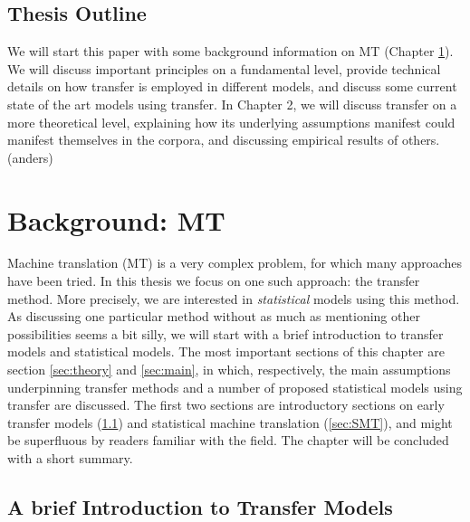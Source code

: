 \documentclass[a4paper, 11pt]{report}
\theoremstyle{definition}
\theoremstyle{plain}
\begin{document}
\section*{Thesis Outline}

We will start this paper with some background information on MT (Chapter \ref{ch:background}). We will discuss important principles on a fundamental level, provide technical details on how transfer is employed in different models, and discuss some current state of the art models using transfer. In Chapter 2, we will discuss transfer on a more theoretical level, explaining how its underlying assumptions manifest could manifest themselves in the corpora, and discussing empirical results of others. (anders)





\chapter{Background: MT}
\label{ch:background}

Machine translation (MT) is a very complex problem, for which many approaches have been tried. In this thesis we focus on one such approach: the transfer method. More precisely, we are interested in \textit{statistical} models using this method. As discussing one particular method without as much as mentioning other possibilities seems a bit silly, we will start with a brief introduction to transfer models and statistical models. The most important sections of this chapter are section \ref{sec:theory} and \ref{sec:main}, in which, respectively, the main assumptions underpinning transfer methods and a number of proposed statistical models using transfer are discussed. The first two sections are introductory sections on early transfer models (\ref{sec:intro}) and statistical machine translation (\ref{sec:SMT}), and might be superfluous by readers familiar with the field. The chapter will be concluded with a short summary.


\section{A brief Introduction to Transfer Models}
\label{sec:intro}
\end{document}
